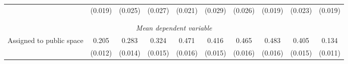\begin{tabular}{l*{9}{c}}
                    &     (0.019)         &     (0.025)         &     (0.027)         &     (0.021)         &     (0.029)         &     (0.026)         &     (0.019)         &     (0.023)         &     (0.019)         \\
\\[-1.8ex] \hline \\[-1.8ex]  
\multicolumn{10}{c}{\textit{Mean dependent variable}} \\ Assigned to public space&       0.205         &       0.283         &       0.324         &       0.471         &       0.416         &       0.465         &       0.483         &       0.405         &       0.134         \\
\,                  &     (0.012)         &     (0.014)         &     (0.015)         &     (0.016)         &     (0.015)         &     (0.016)         &     (0.016)         &     (0.015)         &     (0.011)         \\


\end{tabular}
